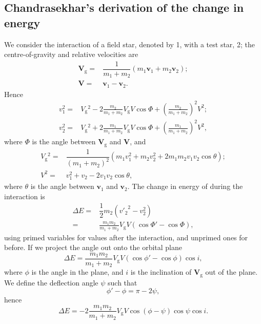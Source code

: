 \documentclass[useAMS,usedcolumn,usegraphicx,usenatbib]{mn2e}
\newcommand{\sub}[1]{\ensuremath{_\mathrm{#1}}}
\newcommand{\recip}[1]{\ensuremath{\dfrac{1}{#1}}}
\begin{document}
\begin{onecolumn}
\subsection{Chandrasekhar's derivation of the change in energy}\label{sec:Chandra}

We consider the interaction of a field star, denoted by 1, with a test star, 2; the centre-of-gravity and relative velocities are
\begin{subequations}
\begin{align}
\boldsymbol{V}\sub{g} = {} & \recip{m_1 + m_2}\left(m_1 \boldsymbol{v}_1 + m_2 \boldsymbol{v}_2\right);\\
\boldsymbol{V} = {} & \boldsymbol{v}_1 - \boldsymbol{v}_2.
\end{align}
\label{eq:Vs}
\end{subequations}
Hence
\begin{subequations}
\begin{align}
v_1^2 = {} & V\sub{g}^2 - 2\frac{m_2}{m_1 + m_2}V\sub{g}V \cos\Phi + \left(\frac{m_2}{m_1 + m_2}\right)^2V^2;\\
v_2^2 = {} & V\sub{g}^2 + 2\frac{m_1}{m_1 + m_2}V\sub{g}V \cos\Phi + \left(\frac{m_1}{m_1 + m_2}\right)^2V^2,
\end{align}
\end{subequations}
where $\Phi$ is the angle between $\boldsymbol{V}\sub{g}$ and $\boldsymbol{V}$, and
\begin{subequations}
\begin{align}
V\sub{g}^2 = {} & \recip{(m_1 + m_2)^2}\left(m_1v_1^2 + m_2v_2^2 + 2 m_1 m_2 v_1 v_2 \cos\theta\right);\\
V^2 = {} & v_1^2 + v_2 - 2 v_1 v_2 \cos\theta,
\end{align}
\label{eq:V2s}
\end{subequations}
where $\theta$ is the angle between $\boldsymbol{v}_1$ and $\boldsymbol{v}_2$. The change in energy of during the interaction is
\begin{align}
\Delta E = {} & \recip{2} m_2 \left({v'_2}^2 - v_2^2\right)\\
 = {} & \frac{m_1 m_2}{m_1 + m_2}V\sub{g}V\left(\cos\Phi' - \cos\Phi\right),
\end{align}
using primed variables for values after the interaction, and unprimed ones for before. If we project the angle out onto the orbital plane
\begin{equation}
\Delta E = \frac{m_1 m_2}{m_1 + m_2}V\sub{g}V\left(\cos\phi' - \cos\phi\right)\cos i,
\end{equation}
where $\phi$ is the angle in the plane, and $i$ is the inclination of $\boldsymbol{V}\sub{g}$ out of the plane. We define the deflection angle $\psi$ such that
\begin{equation}
\phi' - \phi = \pi - 2\psi,
\end{equation}
hence
\begin{equation}
\Delta E = -2\frac{m_1 m_2}{m_1 + m_2}V\sub{g}V\cos(\phi - \psi)\cos\psi\cos i.
\end{equation}


\end{onecolumn}
\end{document}

